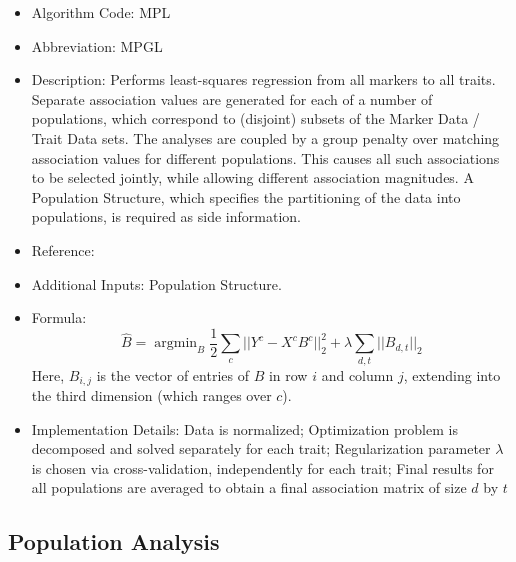 \documentclass{article}
\newcommand{\argmin}{\operatorname{argmin}}
\begin{document}
\begin{itemize}
\item Algorithm Code: MPL 
\item Abbreviation: MPGL
\item Description: Performs least-squares regression from all markers to all traits. Separate association values are generated for each of a number of populations, which correspond to (disjoint) subsets of the Marker Data / Trait Data sets. The analyses are coupled by a group penalty over matching association values for different populations. This causes all such associations to be selected jointly, while allowing different association magnitudes. A Population Structure, which specifies the partitioning of the data into populations, is required as side information.
\item Reference: \cite{MPGL}
\item Additional Inputs: Population Structure.
\item Formula:
\begin{equation*}
\hat{B} = \argmin_{B} \frac{1}{2}\sum_c ||Y^c - X^cB^c||_2^2 + \lambda \sum_{d,t}||B_{d,t}||_2
\end{equation*}
Here, $B_{i,j}$ is the vector of entries of $B$ in row $i$ and column $j$, extending into the third dimension (which ranges over $c$).
\item Implementation Details: Data is normalized; Optimization problem is decomposed and solved separately for each trait; Regularization parameter $\lambda$ is chosen via cross-validation, independently for each trait; Final results for all populations are averaged to obtain a final association matrix of size $d$ by $t$
\end{itemize}

\subsection{Population Analysis}
\end{document}
